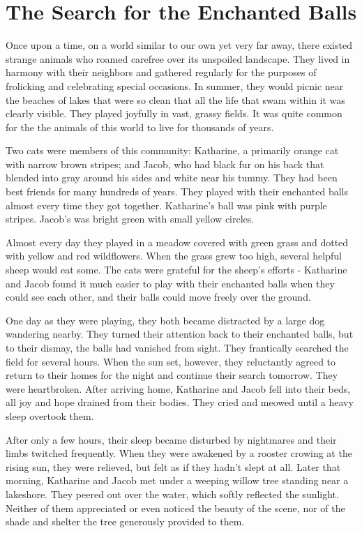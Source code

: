 \chapter{The Search for the Enchanted Balls}
\setlength{\parindent}{2em}
\LARGE

Once upon a time, on a world similar to our own yet very far away, there existed strange animals who roamed carefree over its unspoiled landscape.  They lived in harmony with their neighbors  and gathered regularly for the purposes of frolicking and celebrating special occasions. In summer, they would picnic near the beaches of lakes that were so clean that  all the life that swam within it was clearly visible. They played joyfully in vast, grassy fields. It was quite common for the the animals of this world to live for thousands of years. 

Two cats were members of this community: Katharine, a primarily orange cat with narrow brown stripes; and Jacob, who had black fur on his back that blended into gray around his sides and white near his tummy. They had been best friends for many hundreds of years. They played with their enchanted balls almost every time they got together.  Katharine's ball was pink with purple stripes. Jacob's was bright green with small yellow circles.

Almost every day they played in a meadow covered with green grass and dotted with yellow and red wildflowers. When the grass grew too high, several helpful sheep would eat some. The cats were grateful for the sheep’s efforts  - Katharine and Jacob found it much easier to play with their enchanted balls when they could see each other, and their balls could move freely over the ground.

One day as they were playing, they both became distracted by a large dog wandering nearby. They turned their attention back to their enchanted balls, but to their dismay, the balls had vanished from sight. They frantically searched the field for several hours. When the sun set, however, they reluctantly agreed to return to their homes for the night and continue their search tomorrow. They were heartbroken. After arriving home, Katharine and Jacob fell into their beds, all joy and hope drained from their bodies. They cried and meowed until a heavy sleep overtook them.

After only a few hours, their sleep became disturbed by nightmares and their limbs twitched frequently. When they were awakened by a rooster crowing at the rising sun, they were relieved, but felt as if they hadn't slept at all. Later that morning, Katharine and Jacob met under a weeping willow tree standing near a lakeshore. They peered out over the water, which softly reflected the sunlight. Neither of them appreciated or even noticed the beauty of the scene, nor of the  shade and shelter the tree generously provided to them.

